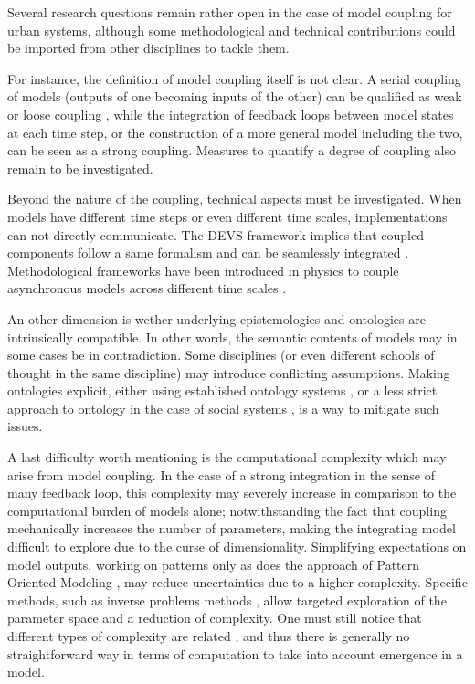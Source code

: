 Several research questions remain rather open in the case of model coupling for urban systems, although some methodological and technical contributions could be imported from other disciplines to tackle them.

For instance, the definition of model coupling itself is not clear. A serial coupling of models (outputs of one becoming inputs of the other) can be qualified as weak or loose coupling \cite{clarke1998loose}, while the integration of feedback loops between model states at each time step, or the construction of a more general model including the two, can be seen as a strong coupling. Measures to quantify a degree of coupling also remain to be investigated.

Beyond the nature of the coupling, technical aspects must be investigated. When models have different time steps or even different time scales, implementations can not directly communicate. The DEVS framework implies that coupled components follow a same formalism and can be seamlessly integrated \cite{vangheluwe2000devs}. Methodological frameworks have been introduced in physics to couple asynchronous models across different time scales \cite{lockerby2015asynchronous}.


An other dimension is wether underlying epistemologies and ontologies are intrinsically compatible. In other words, the semantic contents of models may in some cases be in contradiction. Some disciplines (or even different schools of thought in the same discipline) may introduce conflicting assumptions. Making ontologies explicit, either using established ontology systems \cite{yang2019ontology}, or a less strict approach to ontology in the case of social systems \cite{livet2010ontology}, is a way to mitigate such issues.


A last difficulty worth mentioning is the computational complexity which may arise from model coupling. In the case of a strong integration in the sense of many feedback loop, this complexity may severely increase in comparison to the computational burden of models alone; notwithstanding the fact that coupling mechanically increases the number of parameters, making the integrating model difficult to explore due to the curse of dimensionality. Simplifying expectations on model outputs, working on patterns only as does the approach of Pattern Oriented Modeling \cite{grimm2005pattern}, may reduce uncertainties due to a higher complexity. Specific methods, such as inverse problems methods \cite{vogel2002computational}, allow targeted exploration of the parameter space and a reduction of complexity. One must still notice that different types of complexity are related \cite{raimbault2020relating}, and thus there is generally no straightforward way in terms of computation to take into account emergence in a model.



